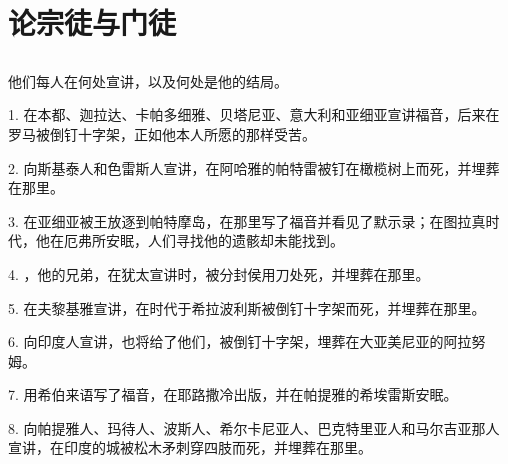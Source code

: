 
\chapter{论宗徒与门徒}



\section{}

他们每人在何处宣讲，以及何处是他的结局。\par

1. 在本都、迦拉达、卡帕多细雅、贝塔尼亚、意大利和亚细亚宣讲福音，后来在罗马被倒钉十字架，正如他本人所愿的那样受苦。\par

2. 向斯基泰人和色雷斯人宣讲，在阿哈雅的帕特雷被钉在橄榄树上而死，并埋葬在那里。\par

3. 在亚细亚被王放逐到帕特摩岛，在那里写了福音并看见了默示录；在图拉真时代，他在厄弗所安眠，人们寻找他的遗骸却未能找到。\par

4. ，他的兄弟，在犹太宣讲时，被分封侯用刀处死，并埋葬在那里。\par

5. 在夫黎基雅宣讲，在时代于希拉波利斯被倒钉十字架而死，并埋葬在那里。\par

6. 向印度人宣讲，也将给了他们，被倒钉十字架，埋葬在大亚美尼亚的阿拉努姆。\par

7. 用希伯来语写了福音，在耶路撒冷出版，并在帕提雅的希埃雷斯安眠。\par

8. 向帕提雅人、玛待人、波斯人、希尔卡尼亚人、巴克特里亚人和马尔吉亚那人宣讲，在印度的城被松木矛刺穿四肢而死，并埋葬在那里。\par


